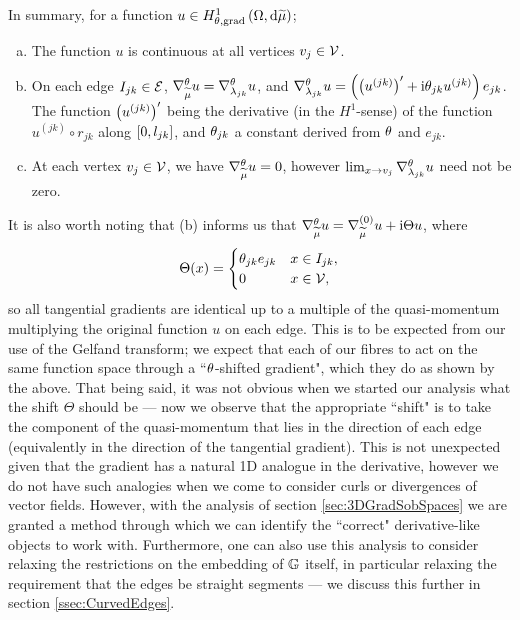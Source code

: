 In summary, for a function $u\in H^1_{\theta, \mathrm{grad}}\left( \Omega, \mathrm{d}\widetilde{\mu} \right)$;
\begin{enumerate}[(a)]
	\item The function $u$ is continuous at all vertices $v_j\in\mathcal{V}$.
	\item On each edge $I_{jk}\in\mathcal{E}$, $\nabla^{\theta}_{\widetilde{\mu}}u = \nabla^{\theta}_{\lambda_{jk}}u$, and $\nabla^{\theta}_{\lambda_{jk}}u = \left( \left( u^{(jk)} \right)' + \mathrm{i}\theta_{jk}u^{(jk)} \right)e_{jk}$.
	The function $\left( u^{(jk)} \right)'$ being the derivative (in the $H^1$-sense) of the function $u^{(jk)}\circ r_{jk}$ along $\left[ 0,l_{jk} \right]$, and $\theta_{jk}$ a constant derived from $\theta$ and $e_{jk}$.
	\item At each vertex $v_j\in\mathcal{V}$, we have $\nabla^{\theta}_{\widetilde{\mu}}u=0$, however $\lim_{x\rightarrow v_j}\nabla^{\theta}_{\lambda_{jk}}u$ need not be zero.
\end{enumerate}
It is also worth noting that (b) informs us that $\nabla^{\theta}_{\widetilde{\mu}}u = \nabla^{(0)}_{\widetilde{\mu}}u + \mathrm{i}\Theta u$, where 
\begin{align*}
	\Theta(x) = 
	\begin{cases} \theta_{jk}e_{jk} & x\in I_{jk}, \\ 0 & x\in\mathcal{V}, \end{cases}
\end{align*}
so all tangential gradients are identical up to a multiple of the quasi-momentum multiplying the original function $u$ on each edge.
This is to be expected from our use of the Gelfand transform; we expect that each of our fibres to act on the same function space through a ``$\theta$-shifted gradient", which they do as shown by the above.
That being said, it was not obvious when we started our analysis what the shift $\Theta$ should be --- now we observe that the appropriate ``shift" is to take the component of the quasi-momentum that lies in the direction of each edge (equivalently in the direction of the tangential gradient).
This is not unexpected given that the gradient has a natural 1D analogue in the derivative, however we do not have such analogies when we come to consider curls or divergences of vector fields.
However, with the analysis of section \ref{sec:3DGradSobSpaces} we are granted a method through which we can identify the ``correct" derivative-like objects to work with.
Furthermore, one can also use this analysis to consider relaxing the restrictions on the embedding of $\mathbb{G}$ itself, in particular relaxing the requirement that the edges be straight segments --- we discuss this further in section \ref{ssec:CurvedEdges}.